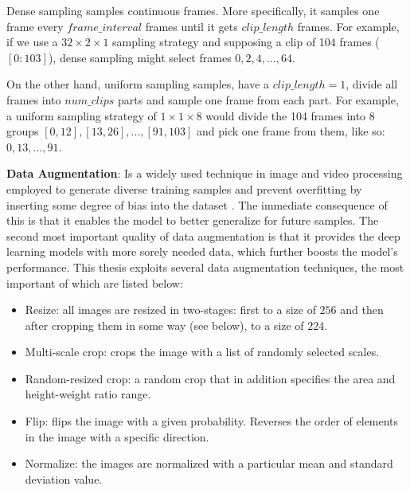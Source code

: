\documentclass[extern,palatino]{cgMA}
\begin{document}
\bigskip
\noindent Dense sampling samples continuous frames. More specifically, it samples one frame every $frame\_interval$ frames until it gets $clip\_length$ frames. For example, if we use a $32 \times 2 \times 1$ sampling strategy and supposing a clip of 104 frames ($[0:103]$), dense sampling might select frames $0, 2, 4, ..., 64$.

\bigskip
\noindent On the other hand, uniform sampling samples, have a  $clip\_length = 1$, divide all frames into $num\_clips$ parts and sample one frame from each part. For example, a uniform sampling strategy of $1 \times 1 \times 8$ would divide the 104 frames into 8 groups $[0, 12], [13, 26], ..., [91, 103]$ and pick one frame from them, like so: $0, 13, ..., 91$.

\bigskip
\noindent\textbf{Data Augmentation}: Is a widely used technique in image and video processing employed to generate diverse training samples and prevent overfitting by inserting some degree of bias into the dataset \cite{mikolajczyk2018data}. The immediate consequence of this is that it enables the model to better generalize for future samples. The second most important quality of data augmentation is that it provides the deep learning models with more sorely needed data, which further boosts the model's performance. This thesis exploits several data augmentation techniques, the most important of which are listed below:

\begin{itemize}
    \item Resize: all images are resized in two-stages: first to a size of $256$ and then after cropping them in some way (see below), to a size of $224$.
    \item Multi-scale crop: crops the image with a list of randomly selected scales.
    \item Random-resized crop: a random crop that in addition specifies the area and height-weight ratio range.
    \item Flip: flips the image with a given probability. Reverses the order of elements in the image with a specific direction.
    \item Normalize: the images are normalized with a particular mean and standard deviation value.
\end{itemize}
\end{document}
